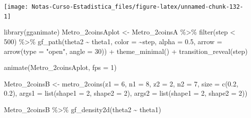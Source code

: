 \documentclass[
  12pt,
]{book}
\newenvironment{Shaded}{\begin{snugshade}}{\end{snugshade}}
\newcommand{\AttributeTok}[1]{\textcolor[rgb]{0.77,0.63,0.00}{#1}}
\newcommand{\DecValTok}[1]{\textcolor[rgb]{0.00,0.00,0.81}{#1}}
\newcommand{\FloatTok}[1]{\textcolor[rgb]{0.00,0.00,0.81}{#1}}
\newcommand{\FunctionTok}[1]{\textcolor[rgb]{0.00,0.00,0.00}{#1}}
\newcommand{\NormalTok}[1]{#1}
\newcommand{\OtherTok}[1]{\textcolor[rgb]{0.56,0.35,0.01}{#1}}
\newcommand{\SpecialCharTok}[1]{\textcolor[rgb]{0.00,0.00,0.00}{#1}}
\newcommand{\StringTok}[1]{\textcolor[rgb]{0.31,0.60,0.02}{#1}}
\theoremstyle{definition}
\theoremstyle{definition}
\theoremstyle{definition}
\theoremstyle{remark}
\begin{document}
\begin{center}\texttt{[image: Notas-Curso-Estadistica\_files/figure-latex/unnamed-chunk-132-1]} \end{center}

\begin{Shaded}
\begin{Highlighting}[]
\FunctionTok{library}\NormalTok{(gganimate)}
\NormalTok{Metro\_2coinsAplot }\OtherTok{\textless{}{-}}\NormalTok{ Metro\_2coinsA }\SpecialCharTok{\%\textgreater{}\%} \FunctionTok{filter}\NormalTok{(step }\SpecialCharTok{\textless{}} 
    \DecValTok{500}\NormalTok{) }\SpecialCharTok{\%\textgreater{}\%} \FunctionTok{gf\_path}\NormalTok{(theta2 }\SpecialCharTok{\textasciitilde{}}\NormalTok{ theta1, }\AttributeTok{color =} \SpecialCharTok{\textasciitilde{}}\NormalTok{step, }
    \AttributeTok{alpha =} \FloatTok{0.5}\NormalTok{, }\AttributeTok{arrow =} \FunctionTok{arrow}\NormalTok{(}\AttributeTok{type =} \StringTok{"open"}\NormalTok{, }\AttributeTok{angle =} \DecValTok{30}\NormalTok{)) }\SpecialCharTok{+} 
    \FunctionTok{theme\_minimal}\NormalTok{() }\SpecialCharTok{+} \FunctionTok{transition\_reveal}\NormalTok{(step)}

\FunctionTok{animate}\NormalTok{(Metro\_2coinsAplot, }\AttributeTok{fps =} \DecValTok{1}\NormalTok{)}
\end{Highlighting}
\end{Shaded}

\begin{Shaded}
\begin{Highlighting}[]
\NormalTok{Metro\_2coinsB }\OtherTok{\textless{}{-}} \FunctionTok{metro\_2coins}\NormalTok{(}\AttributeTok{z1 =} \DecValTok{6}\NormalTok{, }\AttributeTok{n1 =} \DecValTok{8}\NormalTok{, }\AttributeTok{z2 =} \DecValTok{2}\NormalTok{, }
    \AttributeTok{n2 =} \DecValTok{7}\NormalTok{, }\AttributeTok{size =} \FunctionTok{c}\NormalTok{(}\FloatTok{0.2}\NormalTok{, }\FloatTok{0.2}\NormalTok{), }\AttributeTok{args1 =} \FunctionTok{list}\NormalTok{(}\AttributeTok{shape1 =} \DecValTok{2}\NormalTok{, }
        \AttributeTok{shape2 =} \DecValTok{2}\NormalTok{), }\AttributeTok{args2 =} \FunctionTok{list}\NormalTok{(}\AttributeTok{shape1 =} \DecValTok{2}\NormalTok{, }\AttributeTok{shape2 =} \DecValTok{2}\NormalTok{))}

\NormalTok{Metro\_2coinsB }\SpecialCharTok{\%\textgreater{}\%} \FunctionTok{gf\_density2d}\NormalTok{(theta2 }\SpecialCharTok{\textasciitilde{}}\NormalTok{ theta1)}
\end{Highlighting}
\end{Shaded}
\end{document}

